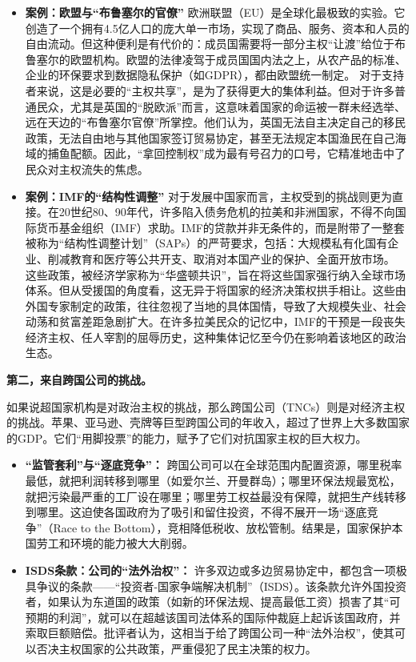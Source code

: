 \begin{itemize}
\item \textbf{案例：欧盟与“布鲁塞尔的官僚”}
欧洲联盟（EU）是全球化最极致的实验。它创造了一个拥有4.5亿人口的庞大单一市场，实现了商品、服务、资本和人员的自由流动。但这种便利是有代价的：成员国需要将一部分主权“让渡”给位于布鲁塞尔的欧盟机构。欧盟的法律凌驾于成员国国内法之上，从农产品的标准、企业的环保要求到数据隐私保护（如GDPR），都由欧盟统一制定。
对于支持者来说，这是必要的“主权共享”，是为了获得更大的集体利益。但对于许多普通民众，尤其是英国的“脱欧派”而言，这意味着国家的命运被一群未经选举、远在天边的“布鲁塞尔官僚”所掌控。他们认为，英国无法自主决定自己的移民政策，无法自由地与其他国家签订贸易协定，甚至无法规定本国渔民在自己海域的捕鱼配额。因此，“拿回控制权”成为最有号召力的口号，它精准地击中了民众对主权流失的焦虑。

\item \textbf{案例：IMF的“结构性调整”}
对于发展中国家而言，主权受到的挑战则更为直接。在20世纪80、90年代，许多陷入债务危机的拉美和非洲国家，不得不向国际货币基金组织（IMF）求助。IMF的贷款并非无条件的，而是附带了一整套被称为“结构性调整计划”（SAPs）的严苛要求，包括：大规模私有化国有企业、削减教育和医疗等公共开支、取消对本国产业的保护、全面开放市场。
这些政策，被经济学家称为“华盛顿共识”，旨在将这些国家强行纳入全球市场体系。但从受援国的角度看，这无异于将国家的经济决策权拱手相让。这些由外国专家制定的政策，往往忽视了当地的具体国情，导致了大规模失业、社会动荡和贫富差距急剧扩大。在许多拉美民众的记忆中，IMF的干预是一段丧失经济主权、任人宰割的屈辱历史，这种集体记忆至今仍在影响着该地区的政治生态。
\end{itemize}

\textbf{第二，来自跨国公司的挑战。}

如果说超国家机构是对政治主权的挑战，那么跨国公司（TNCs）则是对经济主权的挑战。苹果、亚马逊、壳牌等巨型跨国公司的年收入，超过了世界上大多数国家的GDP。它们“用脚投票”的能力，赋予了它们对抗国家主权的巨大权力。
\begin{itemize}
\item \textbf{“监管套利”与“逐底竞争”：} 跨国公司可以在全球范围内配置资源，哪里税率最低，就把利润转移到哪里（如爱尔兰、开曼群岛）；哪里环保法规最宽松，就把污染最严重的工厂设在哪里；哪里劳工权益最没有保障，就把生产线转移到哪里。这迫使各国政府为了吸引和留住投资，不得不展开一场“逐底竞争”（Race to the Bottom），竞相降低税收、放松管制。结果是，国家保护本国劳工和环境的能力被大大削弱。
\item \textbf{ISDS条款：公司的“法外治权”：} 许多双边或多边贸易协定中，都包含一项极具争议的条款——“投资者-国家争端解决机制”（ISDS）。该条款允许外国投资者，如果认为东道国的政策（如新的环保法规、提高最低工资）损害了其“可预期的利润”，就可以在超越该国司法体系的国际仲裁庭上起诉该国政府，并索取巨额赔偿。批评者认为，这相当于给了跨国公司一种“法外治权”，使其可以否决主权国家的公共政策，严重侵犯了民主决策的权力。
\end{itemize}

